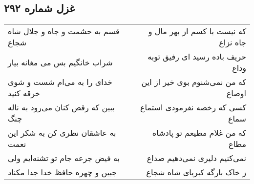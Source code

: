 \begin{center}
\section*{غزل شماره ۲۹۲}
\label{sec:sh292}
\begin{longtable}{l p{0.5cm} r}
قسم به حشمت و جاه و جلال شاه شجاع
&&
که نیست با کسم از بهر مال و جاه نزاع
\\
شراب خانگیم بس می مغانه بیار
&&
حریف باده رسید ای رفیق توبه وداع
\\
خدای را به می‌ام شست و شوی خرقه کنید
&&
که من نمی‌شنوم بوی خیر از این اوضاع
\\
ببین که رقص کنان می‌رود به ناله چنگ
&&
کسی که رخصه نفرمودی استماع سماع
\\
به عاشقان نظری کن به شکر این نعمت
&&
که من غلام مطیعم تو پادشاه مطاع
\\
به فیض جرعه جام تو تشنه‌ایم ولی
&&
نمی‌کنیم دلیری نمی‌دهیم صداع
\\
جبین و چهره حافظ خدا جدا مکناد
&&
ز خاک بارگه کبریای شاه شجاع
\\
\end{longtable}
\end{center}
